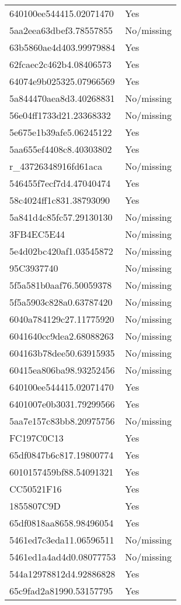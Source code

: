 \begin{tabular}{ll}
640100ee544415.02071470 & Yes \\
5aa2eea63dbef3.78557855 & No/missing \\
63b5860ae4d403.99979884 & Yes \\
62fcaec2c462b4.08406573 & Yes \\
64074e9b025325.07966569 & Yes \\
5a844470aea8d3.40268831 & No/missing \\
56e04ff1733d21.23368332 & No/missing \\
5e675e1b39afe5.06245122 & Yes \\
5aa655ef4408c8.40303802 & Yes \\
r_43726348916fd61aca & No/missing \\
546455f7ecf7d4.47040474 & Yes \\
58c4024ff1c831.38793090 & Yes \\
5a841d4c85fc57.29130130 & No/missing \\
3FB4EC5E44 & No/missing \\
5e4d02bc420af1.03545872 & No/missing \\
95C3937740 & No/missing \\
5f5a581b0aaf76.50059378 & No/missing \\
5f5a5903c828a0.63787420 & No/missing \\
6040a784129c27.11775920 & No/missing \\
6041640cc9dea2.68088263 & No/missing \\
604163b78dee50.63915935 & No/missing \\
60415ea806ba98.93252456 & No/missing \\
640100ee544415.02071470 & Yes \\
6401007e0b3031.79299566 & Yes \\
5aa7e157c83bb8.20975756 & No/missing \\
FC197C0C13 & Yes \\
65df0847b6c817.19800774 & Yes \\
6010157459bf88.54091321 & Yes \\
CC50521F16 & Yes \\
1855807C9D & Yes \\
65df0818aa8658.98496054 & Yes \\
5461ed7c3eda11.06596511 & No/missing \\
5461ed1a4ad4d0.08077753 & No/missing \\
544a12978812d4.92886828 & Yes \\
65c9fad2a81990.53157795 & Yes \\

\end{tabular}
